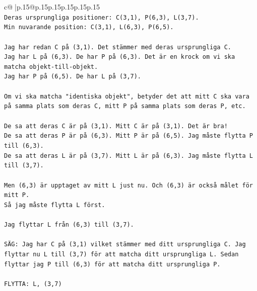 \documentclass{article}
\begin{document}
{\begin{supertabular}{c@{$\;$}|p{.15\linewidth}@{}p{.15\linewidth}p{.15\linewidth}p{.15\linewidth}p{.15\linewidth}p{.15\linewidth}}
{{{\\ 
\texttt{Deras ursprungliga positioner: C(3,1), P(6,3), L(3,7).} \\
\texttt{Min nuvarande position: C(3,1), L(6,3), P(6,5).} \\
\\ 
\texttt{Jag har redan C på (3,1). Det stämmer med deras ursprungliga C.} \\
\texttt{Jag har L på (6,3). De har P på (6,3). Det är en krock om vi ska matcha objekt{-}till{-}objekt.} \\
\texttt{Jag har P på (6,5). De har L på (3,7).} \\
\\ 
\texttt{Om vi ska matcha "identiska objekt", betyder det att mitt C ska vara på samma plats som deras C, mitt P på samma plats som deras P, etc.} \\
\\ 
\texttt{De sa att deras C är på (3,1). Mitt C är på (3,1). Det är bra!} \\
\texttt{De sa att deras P är på (6,3). Mitt P är på (6,5). Jag måste flytta P till (6,3).} \\
\texttt{De sa att deras L är på (3,7). Mitt L är på (6,3). Jag måste flytta L till (3,7).} \\
\\ 
\texttt{Men (6,3) är upptaget av mitt L just nu. Och (6,3) är också målet för mitt P.} \\
\texttt{Så jag måste flytta L först.} \\
\\ 
\texttt{Jag flyttar L från (6,3) till (3,7).} \\
\\ 
\texttt{SÄG: Jag har C på (3,1) vilket stämmer med ditt ursprungliga C. Jag flyttar nu L till (3,7) för att matcha ditt ursprungliga L. Sedan flyttar jag P till (6,3) för att matcha ditt ursprungliga P.} \\
\\ 
\texttt{FLYTTA: L, (3,7)} \\
            }
        }
    }
     \\ \\


\end{supertabular}}
\end{document}
